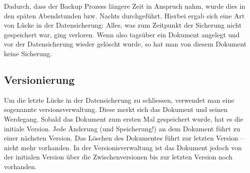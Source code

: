 Dadurch, dass der Backup Prozess längere Zeit in Anspruch nahm, wurde dies in
den späten Abendstunden bzw. Nachts durchgeführt. Hierbei ergab sich eine Art
von Lücke in der Datensicherung: Alles, was zum Zeitpunkt der Sicherung nicht
gespeichert war, ging verloren. Wenn also tagsüber ein Dokument angelegt und
vor der Datensicherung wieder gelöscht wurde, so hat man von diesem Dokument
keine Sicherung.

\subsection{Versionierung}

Um die letzte Lücke in der Datensicherung zu schliessen, verwendet man eine
sogenannte \gls{versionsverwaltung}. Diese merkt sich das Dokument und seinen
Werdegang. Sobald das Dokument zum ersten Mal gespeichert wurde, hat es die
initiale Version. Jede Änderung (und Speicherung!) an dem Dokument führt zu
einer nächsten Version. Das Löschen des Dokumentes führt zur letzten Version --
nicht mehr vorhanden. In der Versionisverwaltung ist das Dokument jedoch von
der initialen Version über die Zwischenversionen bis zur letzten Version noch
vorhanden.
